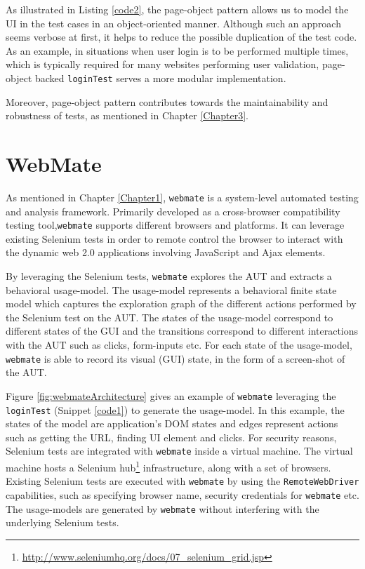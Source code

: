 As illustrated in Listing \ref{code2}, the page-object pattern allows us to model the UI in the test cases in an object-oriented manner. Although such an approach seems verbose at first, it helps to reduce the possible duplication of the test code. As an example, in situations when user login is to be performed multiple times, which is typically required for many websites performing user validation, page-object backed \texttt{loginTest} serves a more modular implementation. 

Moreover, page-object pattern contributes towards the maintainability and robustness of tests\cite{leottaPObs}, as mentioned in Chapter \ref{Chapter3}.


\section{WebMate}
\label{sec:WebMate}
As mentioned in Chapter \ref{Chapter1}, \texttt{webmate}\cite{webmate} is a system-level automated testing and analysis framework. Primarily developed as a cross-browser compatibility testing tool,\texttt{webmate} supports different browsers and platforms. It can leverage existing Selenium tests in order to remote control the browser to interact with the dynamic web 2.0 applications involving JavaScript and Ajax elements. 

By leveraging the Selenium tests, \texttt{webmate} explores the AUT and extracts a behavioral usage-model. The usage-model represents a behavioral finite state model which captures the exploration graph of the different actions performed by the Selenium test on the AUT. The states of the usage-model correspond to different states of the GUI and the transitions correspond to different interactions with the AUT such as clicks, form-inputs etc. For each state of the usage-model, \texttt{webmate} is able to record its visual (GUI) state, in the form of a screen-shot of the AUT.

Figure \ref{fig:webmateArchitecture} gives an example of \texttt{webmate} leveraging the \texttt{loginTest} (Snippet \ref{code1}) to generate the usage-model. In this example, the states of the model are application's DOM states and edges represent actions such as getting the URL, finding UI element and clicks. For security reasons, Selenium tests are integrated with \texttt{webmate} inside a virtual machine. The virtual machine hosts a Selenium hub\footnote{\url{http://www.seleniumhq.org/docs/07_selenium_grid.jsp}} infrastructure, along with a set of browsers. Existing Selenium tests are executed with \texttt{webmate} by using the \texttt{RemoteWebDriver} capabilities, such as specifying browser name, security credentials for \texttt{webmate} etc. The usage-models are generated by \texttt{webmate} without interfering with the underlying Selenium tests. 


